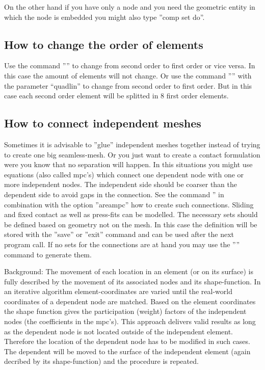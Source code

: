 \documentclass{article}
\begin{document}
\begin{appendix}
On the other hand if you have only a node and you need the geometric entity in which the node is embedded you might also type ''comp set do''.


\subsection{\label{How to change the order of elements}How to change the order of elements}
Use the command '''' to change from second order to first order or vice versa. In this case the amount of elements will not change. Or use the command '''' with the parameter ``quadlin'' to change from second order to first order. But in this case each second order element will be splitted in 8 first order elements. 


\subsection{\label{How to connect independent meshes}How to connect independent meshes}
Sometimes it is advisable to ''glue'' independent meshes together instead of trying to create one big seamless-mesh. Or you just want to create a contact formulation were you know that no separation will happen. In this situations you might use equations (also called mpc's) which connect one dependent node with one or more independent nodes. The independent side should be coarser than the dependent side to avoid gaps in the connection. See the command '' in combination with the option ''areampc'' how to create such connections. Sliding and fixed contact as well as press-fits can be modelled. The necessary sets should be defined based on geometry not on the mesh. In this case the definition will be stored with the ''save'' or ''exit'' command and can be used after the next program call. If no sets for the connections are at hand you may use the '''' command to generate them.

Background: The movement of each location in an element (or on its surface) is fully described by the movement of its associated nodes and its shape-function. In an iterative algorithm element-coordinates are varied until the real-world coordinates of a dependent node are matched. Based on the element coordinates the shape function gives the participation (weight) factors of the independent nodes (the coefficients in the mpc's). This approach delivers valid results as long as the dependent node is not located outside of the independent element. Therefore the location of the dependent node has to be modified in such cases. The dependent will be moved to the surface of the independent element (again decribed by its shape-function) and the procedure is repeated.


\end{appendix}
\end{document}
